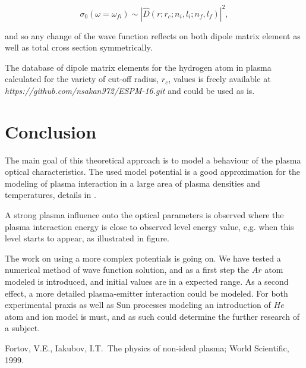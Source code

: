 \documentclass[a1]{sciposter}
\begin{document}
\begin{multicols}{3}
\begin{equation}
\label{eq::Presek_totalni_dipolni}
    \sigma _0 (\omega = \omega _{fi}) \sim
    \left| \hat{D}(r;r_{c};n_i,l_i;n_f,l_f) \right| ^2,
\end{equation}

{\noindent and so any change of the wave function reflects on both dipole matrix element as well as total cross section symmetrically.}


The database of dipole matrix elements for the hydrogen atom in plasma calculated for the variety of cut-off radius, $r_{c}$, values is freely available at {\it https://github.com/nsakan972/ESPM-16.git} and could be used as is. 


\section{Conclusion}

The main goal of this theoretical approach is to model a behaviour of the plasma optical characteristics. The used model potential is a good approximation for the modeling of plasma interaction in a large area of plasma densities and temperatures, details in  \cite{Sakan_atoms_2018}. 

A strong plasma influence onto the optical parameters is observed where the plasma interaction energy is close to observed level energy value, e,g. when this level starts to appear, as illustrated in figure. 

The work on using a more complex potentials is going on. We have tested a numerical method of wave function solution, and as a first step the $Ar$ atom  modeled is introduced, and initial values are in a expected range. As a second effect, a more detailed plasma-emitter interaction could be modeled. For both experimental praxis as well as Sun processes modeling an introduction of $He$ atom and ion model is must, and as such could determine the further research of a subject.

\begin{thebibliography}{99}

 Fortov, V.E., Iakubov, I.T.~The physics of non-ideal plasma; World Scientific,  1999.


\end{thebibliography}
\end{multicols}
\end{document}
